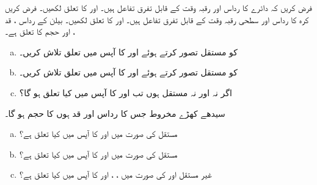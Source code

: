 فرض کریں کہ دائرے کا رداس  اور رقبہ  وقت  کے قابل تفرق تفاعل ہیں۔  اور  کا تعلق لکھیں۔
فرض کریں کرہ کا رداس  اور سطحی رقبہ  وقت  کے قابل تفرق تفاعل ہیں۔ اور  کا تعلق لکھیں۔
بیلن کے رداس ، قد ، اور حجم  کا تعلق  ہے۔
\begin{enumerate}[a.]
\item
{} کو مستقل تصور کرتے ہوئے  اور  کا آپس میں تعلق تلاش کریں۔
\item
{} کو مستقل تصور کرتے ہوئے  اور  کا آپس میں تعلق تلاش کریں۔
\item
اگر نہ  اور نہ  مستقل ہوں تب   اور   کا آپس میں کیا تعلق ہو گا؟

\end{enumerate}
سیدھے کھڑے مخروط جس کا رداس  اور قد  ہوں کا  حجم    ہو گا۔
\begin{enumerate}[a.]
\item
مستقل  کی صورت میں  اور  کا آپس میں کیا تعلق ہے؟
\item
مستقل  کی صورت میں  اور  کا آپس میں کیا تعلق ہے؟
\item
غیر مستقل  اور  کی صورت میں  ، ، اور  کا آپس میں کیا تعلق ہے؟
\end{enumerate}
